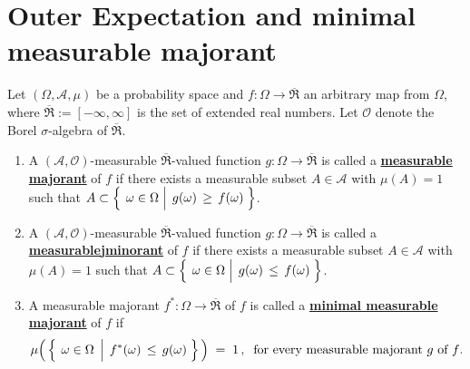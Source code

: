 

\section{Outer Expectation and minimal measurable majorant}
\setcounter{theorem}{0}
\setcounter{equation}{0}


\renewcommand{\theenumi}{\roman{enumi}}
\renewcommand{\labelenumi}{\textnormal{(\theenumi)}$\;\;$}


\begin{definition}
\label{defn:MajorantsOuterExpectation}
\mbox{}\vskip 0.1cm
\noindent
Let $(\Omega,\mathcal{A},\mu)$ be a probability space and
$f : \Omega \longrightarrow \overline{\Re}$
an arbitrary map from $\Omega$, where $\overline{\Re} := [-\infty,\infty]$ is the set of extended real numbers.
Let $\mathcal{O}$ denote the Borel $\sigma$-algebra of $\overline{\Re}$.
\begin{enumerate}
\item
	A $(\mathcal{A},\mathcal{O})$-measurable $\overline{\Re}$-valued function
	$g : \Omega\longrightarrow\overline{\Re}$
	is called a \underline{\textbf{measurable majorant}} of $f$ if there exists a measurable
	subset $A \in \mathcal{A}$ with $\mu(A) = 1$ such that
	$A \subset \left\{\;\left.\omega\overset{{\color{white}.}}{\in}\Omega\;\right\vert\; g(\omega) \,\geq\, f(\omega)\;\right\}$.
\item
	A $(\mathcal{A},\mathcal{O})$-measurable $\overline{\Re}$-valued function
	$g : \Omega\longrightarrow\overline{\Re}$
	is called a \underline{\textbf{measurable{\color{white}j}minorant}} of $f$ if there exists a measurable
	subset $A \in \mathcal{A}$ with $\mu(A) = 1$ such that
	$A \subset \left\{\;\left.\omega\overset{{\color{white}.}}{\in}\Omega\;\right\vert\; g(\omega) \,\leq\, f(\omega)\;\right\}$.
\item
	A measurable majorant $f^{*}:\Omega\longrightarrow\overline{\Re}$ of $f$
	is called a \underline{\textbf{minimal measurable majorant}} of $f$ if
	\begin{equation*}
	\mu\!\left(\,
		\left\{\;\left.\omega\overset{{\color{white}.}}{\in}\Omega\;\,\right\vert\; f^{*}(\omega) \,\leq\, g(\omega)\;\right\}
		\,\right)
	\;=\;1\,,\;\;
	\textnormal{for every measurable majorant $g$ of $f$}.

\end{equation*}
\end{enumerate}
\end{definition}
